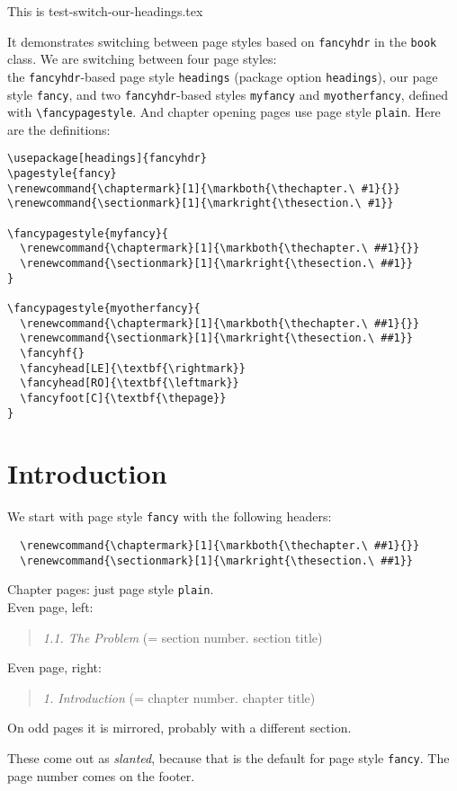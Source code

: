 \documentclass[openany]{book}
\renewcommand{\chaptermark}[1]{\markboth{\thechapter.\ #1}{}}
\renewcommand{\sectionmark}[1]{\markright{\thesection.\ #1}}
\renewcommand{\chaptermark}[1]{\markboth{\thechapter.\ ##1}{}}
\renewcommand{\sectionmark}[1]{\markright{\thesection.\ ##1}}
\renewcommand{\chaptermark}[1]{\markboth{\thechapter.\ ##1}{}}
\renewcommand{\sectionmark}[1]{\markright{\thesection.\ ##1}}
\begin{document}
\tableofcontents

\newpage
\thispagestyle{plain}

\noindent
\begin{boxedminipage}{\textwidth}
  This is test-switch-our-headings.tex

It demonstrates switching between page styles based on
\texttt{fancyhdr} in the \texttt{book} class. We are switching between
four page styles:\\ the \texttt{fancyhdr}-based page style
\texttt{headings} (package option \texttt{headings}), our page style
\texttt{fancy}, and two \texttt{fancyhdr}-based styles \texttt{myfancy}
and \texttt{myotherfancy}, defined with \verb|\fancypagestyle|. And
chapter opening pages use page style \texttt{plain}.
  Here are the definitions:

\begin{verbatim}
\usepackage[headings]{fancyhdr}
\pagestyle{fancy}
\renewcommand{\chaptermark}[1]{\markboth{\thechapter.\ #1}{}}
\renewcommand{\sectionmark}[1]{\markright{\thesection.\ #1}}

\fancypagestyle{myfancy}{
  \renewcommand{\chaptermark}[1]{\markboth{\thechapter.\ ##1}{}}
  \renewcommand{\sectionmark}[1]{\markright{\thesection.\ ##1}}
}

\fancypagestyle{myotherfancy}{
  \renewcommand{\chaptermark}[1]{\markboth{\thechapter.\ ##1}{}}
  \renewcommand{\sectionmark}[1]{\markright{\thesection.\ ##1}}
  \fancyhf{}
  \fancyhead[LE]{\textbf{\rightmark}}
  \fancyhead[RO]{\textbf{\leftmark}}
  \fancyfoot[C]{\textbf{\thepage}}
}
\end{verbatim}
\end{boxedminipage}

\chapter{Introduction}

\noindent
\begin{boxedminipage}{\textwidth}
We start with page style \texttt{fancy} with the following headers:
\begin{verbatim}
  \renewcommand{\chaptermark}[1]{\markboth{\thechapter.\ ##1}{}}
  \renewcommand{\sectionmark}[1]{\markright{\thesection.\ ##1}}
\end{verbatim}
%
Chapter pages: just page style \texttt{plain}.
\\
Even page, left:
\begin{quote}
  \textsl{1.1. The Problem} (= section number. section title)
\end{quote}
Even page, right:
\begin{quote}
  \textsl{1. Introduction} (= chapter number. chapter title)
\end{quote}
On odd pages it is mirrored, probably with a different section.

These come out as \textsl{slanted}, because that is the default for page style \texttt{fancy}.
The page number comes on the footer.
\end{boxedminipage}
\bigskip
\end{document}
